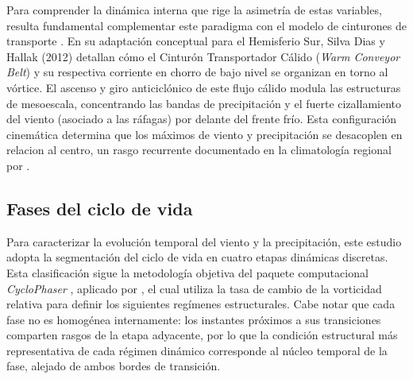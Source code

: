 Para comprender la dinámica interna que rige la asimetría de estas variables, resulta fundamental complementar este paradigma con el modelo de cinturones de transporte \citep{browning1986conceptual}. En su adaptación conceptual para el Hemisferio Sur, Silva Dias y Hallak (2012) detallan cómo el Cinturón Transportador Cálido (\textit{Warm Conveyor Belt}) y su respectiva corriente en chorro de bajo nivel se organizan en torno al vórtice. El ascenso y giro anticiclónico de este flujo cálido modula las estructuras de mesoescala, concentrando las bandas de precipitación y el fuerte cizallamiento del viento (asociado a las ráfagas) por delante del frente frío. Esta configuración cinemática determina que los máximos de viento y precipitación se desacoplen en relacion al centro, un rasgo recurrente documentado en la climatología regional por \citet{reboita2010south}.

\subsection{Fases del ciclo de vida}\label{subsec:tb_fases}
Para caracterizar la evolución temporal del viento y la precipitación, este estudio adopta la segmentación del ciclo de vida en cuatro etapas dinámicas discretas. Esta clasificación sigue la metodología objetiva del paquete computacional \textit{CycloPhaser} \citep{deSouza2025CycloPhaser}, aplicado por \citet{coutodesouza2024new}, el cual utiliza la tasa de cambio de la vorticidad relativa para definir los siguientes regímenes estructurales. Cabe notar que cada fase no es homogénea internamente: los instantes próximos a sus transiciones comparten rasgos de la etapa adyacente, por lo que la condición estructural más representativa de cada régimen dinámico corresponde al núcleo temporal de la fase, alejado de ambos bordes de transición.

